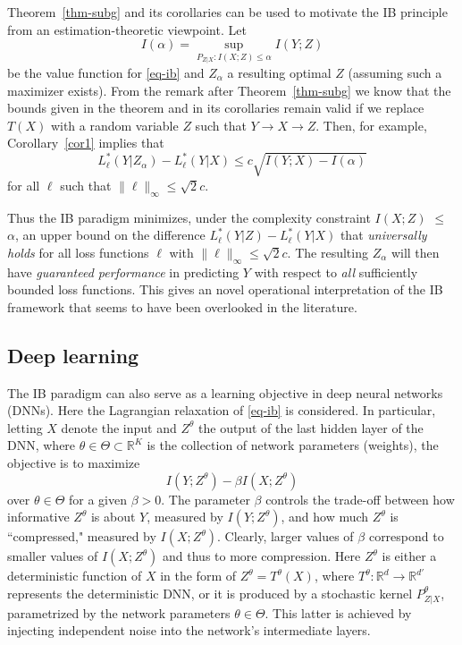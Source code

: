 \documentclass[11pt]{article}
\def\R{{\mathbb R}}
\begin{document}
Theorem~\ref{thm-subg} and its corollaries can be used to motivate the IB principle from an estimation-theoretic viewpoint. Let 
\[
I(\alpha) = \sup_{P_{Z|X}: I(X;Z)\le \alpha} I(Y;Z)
\]
be the  value function for \eqref{eq-ib} and $Z_{\alpha}$ a resulting optimal $Z$ (assuming such a maximizer exists). From the remark after Theorem~\ref{thm-subg} we know that the bounds given in the theorem and in its corollaries remain valid if we replace $T(X)$ with a random variable $Z$ such that $Y\to X\to Z$. Then, for example, Corollary~\ref{cor1}  implies that 
\[
 L_\ell^*(Y|Z_{\alpha}) - L_\ell^*(Y|X)   \le  c \sqrt{ I(Y;X)- I(\alpha)}
\]
for all $\ell$ such that $\|\ell\|_{\infty}\le \sqrt{2} c$. 

Thus the IB paradigm minimizes,  under the complexity constraint $I(X;Z)$ $\le$ $\alpha$,  an upper bound on the difference $L_\ell^*(Y|Z) - L_\ell^*(Y|X)  $  
that \emph{universally holds} for all loss functions $\ell$ with $\|\ell\|_{\infty}\le \sqrt{2} c$. The resulting $Z_{\alpha}$  will then  have \emph{guaranteed performance} in predicting $Y$ with respect to \emph{all} sufficiently bounded loss functions. This gives an  novel operational interpretation of the IB framework that seems to have been overlooked in the literature.  


\subsection{Deep learning} 
\label{sec-dl} 
The IB paradigm can also serve as a learning objective in deep neural networks (DNNs).  
Here  the Lagrangian relaxation of \eqref{eq-ib} is considered.
In particular, letting $X$ denote the input and $Z^{\theta}$ the output of the last hidden layer of the DNN, where $\theta \in \Theta\subset \R^K$ is the collection of network parameters (weights), the objective is to maximize 
\begin{equation}
\label{eq-ib-lgr}
    I(Y;Z^{\theta}) -\beta I(X;Z^{\theta}) 
\end{equation}
over $\theta\in \Theta$ for a given $\beta>0$.  The parameter $\beta$ controls the trade-off between how informative $Z^{\theta}$ is about $Y$, measured by $I(Y;Z^{\theta})$,  and how much $Z^{\theta}$ is ``compressed,"  measured by $I(X;Z^{\theta})$.  Clearly, larger values of $\beta$ correspond to smaller values of $I(X;Z^{\theta})$ and thus to more compression. Here $Z^{\theta}$ is  either  a deterministic function of $X$ in the form of $Z^{\theta}=T^{\theta}(X)$, where 
$T^{\theta}:\R^d \to \R^{d'}$ represents the deterministic DNN, or it is produced by a stochastic kernel $P^{\theta}_{Z|X}$, parametrized by the network parameters $\theta\in \Theta$. This latter is achieved by injecting independent noise into the network's intermediate layers. 
\end{document}
